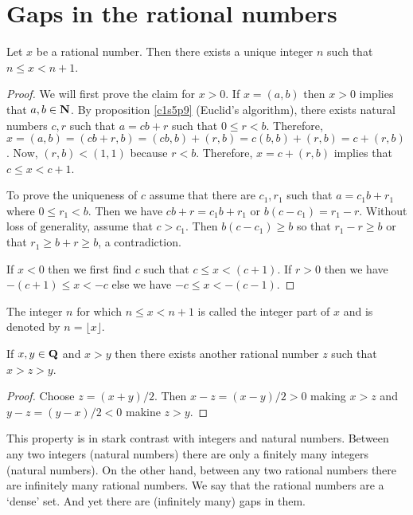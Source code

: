 \section{Gaps in the rational numbers}\label{c3s4}
\begin{prop}\label{c3s4p1}
Let $x$ be a rational number. Then there exists a unique integer $n$ such
that $n \le x < n + 1$.
\end{prop}
\begin{proof}
We will first prove the claim for $x > 0$. If $x = (a, b)$ then $x > 0$
implies that $a, b \in \mathbf{N}$. By proposition \ref{c1s5p9} (Euclid's
algorithm), there exists natural numbers $c, r$ such that $a = cb + r$ 
such that $0 \le r < b$. Therefore, $x = (a, b) = (cb + r, b) = (cb, b) 
+ (r, b) = c(b, b) + (r, b) = c + (r, b)$. Now, $(r, b) < (1, 1)$ because
$r < b$. Therefore, $x = c + (r, b)$ implies that $c \le x < c + 1$.

To prove the uniqueness of $c$ assume that there are $c_1, r_1$ such
that $a = c_1b + r_1$ where $0 \le r_1 < b$. Then we have $cb + r = c_1b
+ r_1$ or $b(c - c_1) = r_1 - r$. Without loss of generality, assume that
$c > c_1$. Then $b(c - c_1) \ge b$ so that $r_1 - r \ge b$ or that $r_1
\ge b + r \ge b$, a contradiction.

If $x < 0$ then we first find $c$ such that $c \le x < (c + 1)$. If $r > 0$
then we have $-(c + 1) \le x < -c$ else we have $-c \le x < -(c - 1)$.
\end{proof}

\begin{defn}\label{c3s4d1}
The integer $n$ for which $n \le x < n + 1$ is called the integer part
of $x$ and is denoted by $n = \lfloor x \rfloor$.
\end{defn}

\begin{prop}\label{c3s4p2}
If $x, y \in \mathbf{Q}$ and $x > y$ then there exists another rational number
$z$ such that $x > z > y$.
\end{prop}
\begin{proof}
Choose $z = (x + y)/2$. Then $x - z = (x - y)/2 > 0$ making $x > z$ and
$y - z = (y - x)/2 < 0$ makine $z > y$.
\end{proof}

This property is in stark contrast with integers and natural numbers. 
Between any two integers (natural numbers) there are only a finitely
many integers (natural numbers). On the other hand, between any two
rational numbers there are infinitely many rational numbers. We say that
the rational numbers are a `dense' set. And yet there are (infinitely many)
gaps in them.

